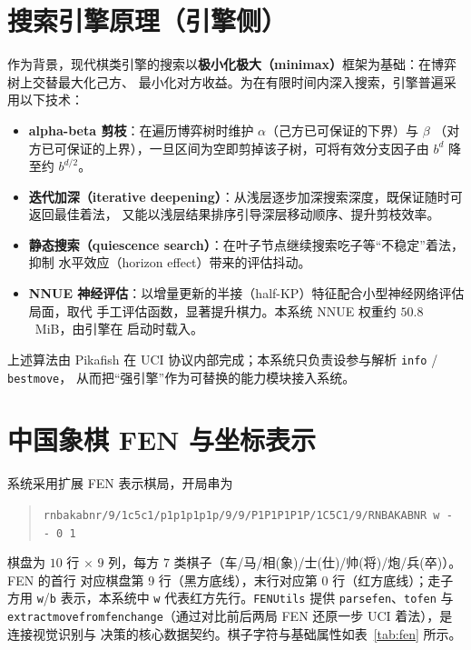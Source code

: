 \documentclass[UTF8, a4paper, 11pt, openany]{ctexbook}
\renewcommand{\_}{\textunderscore\allowbreak}
\begin{document}
\section{搜索引擎原理（引擎侧）}
\label{sec:search}
作为背景，现代棋类引擎的搜索以\textbf{极小化极大（minimax）}框架为基础：在博弈树上交替最大化己方、
最小化对方收益。为在有限时间内深入搜索，引擎普遍采用以下技术\cite{russell2020ai}：
\begin{itemize}[itemsep=2pt]
  \item \textbf{alpha-beta 剪枝}：在遍历博弈树时维护 $\alpha$（己方已可保证的下界）与 $\beta$
        （对方已可保证的上界），一旦区间为空即剪掉该子树，可将有效分支因子由 $b^d$ 降至约 $b^{d/2}$。
  \item \textbf{迭代加深（iterative deepening）}：从浅层逐步加深搜索深度，既保证随时可返回最佳着法，
        又能以浅层结果排序引导深层移动顺序、提升剪枝效率。
  \item \textbf{静态搜索（quiescence search）}：在叶子节点继续搜索吃子等“不稳定”着法，抑制
        水平效应（horizon effect）带来的评估抖动。
  \item \textbf{NNUE 神经评估}：以增量更新的半接（half-KP）特征配合小型神经网络评估局面，取代
        手工评估函数，显著提升棋力\cite{nasu2018nnue}。本系统 NNUE 权重约 $50.8$~MiB，由引擎在
        启动时载入。
\end{itemize}
上述算法由 Pikafish 在 UCI 协议内部完成；本系统只负责设参与解析 \texttt{info} / \texttt{bestmove}，
从而把“强引擎”作为可替换的能力模块接入系统。

\section{中国象棋 FEN 与坐标表示}
\label{sec:fen}
系统采用扩展 FEN 表示棋局，开局串为
\begin{quote}
\texttt{rnbakabnr/9/1c5c1/p1p1p1p1p/9/9/P1P1P1P1P/1C5C1/9/RNBAKABNR w - - 0 1}
\end{quote}
棋盘为 $10$ 行 $\times$ $9$ 列，每方 $7$ 类棋子（车/马/相(象)/士(仕)/帅(将)/炮/兵(卒)）。FEN 的首行
对应棋盘第 9 行（黑方底线），末行对应第 0 行（红方底线）；走子方用 \texttt{w}/\texttt{b} 表示，本系统中
\texttt{w} 代表红方先行\cite{xqfen2007}。\texttt{FENUtils} 提供 \texttt{parse\_fen}、\texttt{to\_fen} 与
\texttt{extract\_move\_from\_fen\_change}（通过对比前后两局 FEN 还原一步 UCI 着法），是连接视觉识别与
决策的核心数据契约。棋子字符与基础属性如表~\ref{tab:fen} 所示。
\end{document}
